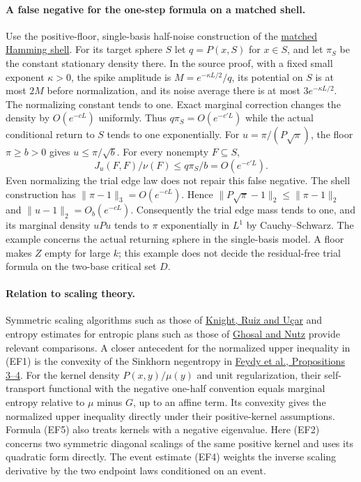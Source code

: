\paragraph{A false negative for the one-step formula on a matched shell.}
Use the positive-floor, single-basis half-noise construction of the
\href{https://airr.science/papers/ARR-2026-2B2W1WQ7DF9N5VW7/versions/v1/}{matched Hamming shell}.
For its target sphere $S$ let $q=P(x,S)$ for $x\in S$, and let
$\pi_S$ be the constant stationary density there. In the source proof,
with a fixed small exponent $\kappa>0$, the spike amplitude is
$M=e^{-\kappa L/2}/q$, its potential on $S$ is at most $2M$ before
normalization, and its noise average there is at most $3e^{-\kappa L/2}$.
The normalizing constant tends to one. Exact marginal correction changes
the density by $O(e^{-cL})$ uniformly. Thus $q\pi_S=O(e^{-c'L})$ while
the actual conditional return to $S$ tends to one exponentially.
For $u=\pi/(P\sqrt\pi)$, the floor $\pi\ge b>0$ gives $u\le\pi/\sqrt b$.
For every nonempty $F\subseteq S$,
\[
        J_u(F,F)/\nu(F)\le q\pi_S/b=O(e^{-c'L}).
\]
Even normalizing the trial edge law does not repair this false negative.
The shell construction has $\|\pi-1\|_3=O(e^{-cL})$. Hence
$\|P\sqrt\pi-1\|_2\le\|\pi-1\|_2$ and $\|u-1\|_2=O_b(e^{-cL})$.
Consequently the trial edge mass tends to one, and its marginal density
$uPu$ tends to $\pi$ exponentially in $L^1$ by Cauchy--Schwarz.
The example concerns the actual returning sphere in the single-basis
model. A floor makes $Z$ empty for large $k$; this example does not
decide the residual-free trial formula on the two-base critical set $D$.

\paragraph{Relation to scaling theory.}
Symmetric scaling algorithms such as those of
\href{https://strathprints.strath.ac.uk/49349/1/main_revised3.pdf}{Knight, Ruiz and U\c{c}ar}
and entropy estimates for entropic plans such as those of
\href{https://www.math.columbia.edu/~mnutz/docs/Sinkhorn_rate.pdf}{Ghosal and Nutz}
provide relevant comparisons. A closer antecedent for the normalized
upper inequality in (EF1) is the convexity of the Sinkhorn negentropy
in \href{https://proceedings.mlr.press/v89/feydy19a.html}{Feydy et al.,
Propositions 3--4}. For the kernel density $P(x,y)/\mu(y)$ and unit
regularization, their self-transport functional with the negative
one-half convention equals marginal entropy relative to $\mu$ minus
$G$, up to an affine term. Its convexity gives the normalized upper
inequality directly under their positive-kernel assumptions. Formula
(EF5) also treats kernels with a negative eigenvalue. Here (EF2) concerns two symmetric diagonal
scalings of the same positive kernel and uses its quadratic form directly.
The event estimate (EF4) weights the inverse scaling derivative by the
two endpoint laws conditioned on an event.
